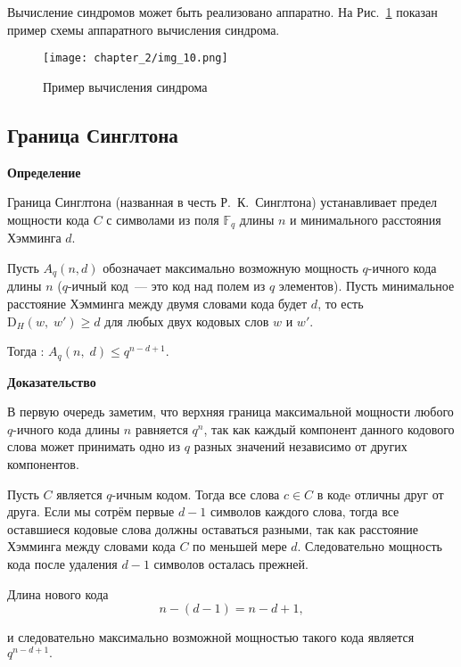 Вычисление синдромов может быть реализовано аппаратно. На Рис.~\ref{img_10} показан
пример схемы аппаратного вычисления синдрома.
\begin{figure}[htbp]
\begin{center}
\texttt{[image: chapter\_2/img\_10.png]}
\end{center}
\caption{Пример вычисления синдрома}
\label{img_10}
\end{figure}

\subsection{Граница Синглтона}
\textbf{Определение}

Граница Синглтона (названная в честь Р. К. Синглтона) устанавливает предел мощности кода $C$ 
с символами из поля $\mathbb{F}_q$ длины $n$ и минимального расстояния Хэмминга $d$.  

Пусть $A_q(n,d)$ обозначает максимально возможную мощность $q$-ичного кода длины $n$
($q$-ичный код — это код над полем из $q$ элементов). Пусть минимальное расстояние Хэмминга
между двумя словами кода будет $d$, то есть $\mathrm D_H(w,\;w')\geqslant d$ для любых двух
кодовых слов $w$ и $w'$. 

Тогда : $A_q(n,\;d)\leqslant q^{n-d+1}.$

\textbf{Доказательство}

В первую очередь заметим, что верхняя граница максимальной мощности любого $q$-ичного кода
длины $n$ равняется $q^n$, так как каждый компонент данного кодового слова может принимать
одно из $q$ разных значений независимо от других компонентов.

Пусть $C$ является $q$-ичным кодом. Тогда все слова $c \in C$ в кодe отличны друг от друга.
Если мы сотрём первые $d-1$ символов каждого слова, тогда все оставшиеся кодовые слова должны
оставаться разными, так как расстояние Хэмминга между словами кода $C$ по меньшей мере $d$.
Следовательно мощность кода после удаления $d-1$ символов осталась прежней.

Длина нового кода
$$n-(d-1)=n-d+1,$$

и следовательно максимально возможной мощностью такого кода является $q^{n-d+1}.$


